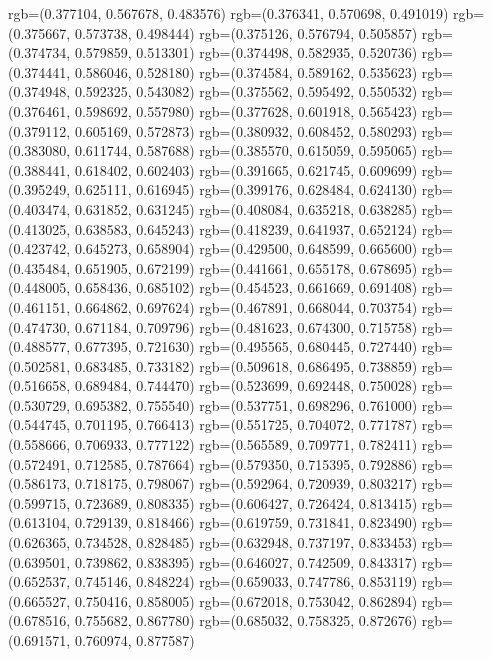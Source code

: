 {{{					rgb=(0.377104, 0.567678, 0.483576)
					rgb=(0.376341, 0.570698, 0.491019)
					rgb=(0.375667, 0.573738, 0.498444)
					rgb=(0.375126, 0.576794, 0.505857)
					rgb=(0.374734, 0.579859, 0.513301)
					rgb=(0.374498, 0.582935, 0.520736)
					rgb=(0.374441, 0.586046, 0.528180)
					rgb=(0.374584, 0.589162, 0.535623)
					rgb=(0.374948, 0.592325, 0.543082)
					rgb=(0.375562, 0.595492, 0.550532)
					rgb=(0.376461, 0.598692, 0.557980)
					rgb=(0.377628, 0.601918, 0.565423)
					rgb=(0.379112, 0.605169, 0.572873)
					rgb=(0.380932, 0.608452, 0.580293)
					rgb=(0.383080, 0.611744, 0.587688)
					rgb=(0.385570, 0.615059, 0.595065)
					rgb=(0.388441, 0.618402, 0.602403)
					rgb=(0.391665, 0.621745, 0.609699)
					rgb=(0.395249, 0.625111, 0.616945)
					rgb=(0.399176, 0.628484, 0.624130)
					rgb=(0.403474, 0.631852, 0.631245)
					rgb=(0.408084, 0.635218, 0.638285)
					rgb=(0.413025, 0.638583, 0.645243)
					rgb=(0.418239, 0.641937, 0.652124)
					rgb=(0.423742, 0.645273, 0.658904)
					rgb=(0.429500, 0.648599, 0.665600)
					rgb=(0.435484, 0.651905, 0.672199)
					rgb=(0.441661, 0.655178, 0.678695)
					rgb=(0.448005, 0.658436, 0.685102)
					rgb=(0.454523, 0.661669, 0.691408)
					rgb=(0.461151, 0.664862, 0.697624)
					rgb=(0.467891, 0.668044, 0.703754)
					rgb=(0.474730, 0.671184, 0.709796)
					rgb=(0.481623, 0.674300, 0.715758)
					rgb=(0.488577, 0.677395, 0.721630)
					rgb=(0.495565, 0.680445, 0.727440)
					rgb=(0.502581, 0.683485, 0.733182)
					rgb=(0.509618, 0.686495, 0.738859)
					rgb=(0.516658, 0.689484, 0.744470)
					rgb=(0.523699, 0.692448, 0.750028)
					rgb=(0.530729, 0.695382, 0.755540)
					rgb=(0.537751, 0.698296, 0.761000)
					rgb=(0.544745, 0.701195, 0.766413)
					rgb=(0.551725, 0.704072, 0.771787)
					rgb=(0.558666, 0.706933, 0.777122)
					rgb=(0.565589, 0.709771, 0.782411)
					rgb=(0.572491, 0.712585, 0.787664)
					rgb=(0.579350, 0.715395, 0.792886)
					rgb=(0.586173, 0.718175, 0.798067)
					rgb=(0.592964, 0.720939, 0.803217)
					rgb=(0.599715, 0.723689, 0.808335)
					rgb=(0.606427, 0.726424, 0.813415)
					rgb=(0.613104, 0.729139, 0.818466)
					rgb=(0.619759, 0.731841, 0.823490)
					rgb=(0.626365, 0.734528, 0.828485)
					rgb=(0.632948, 0.737197, 0.833453)
					rgb=(0.639501, 0.739862, 0.838395)
					rgb=(0.646027, 0.742509, 0.843317)
					rgb=(0.652537, 0.745146, 0.848224)
					rgb=(0.659033, 0.747786, 0.853119)
					rgb=(0.665527, 0.750416, 0.858005)
					rgb=(0.672018, 0.753042, 0.862894)
					rgb=(0.678516, 0.755682, 0.867780)
					rgb=(0.685032, 0.758325, 0.872676)
					rgb=(0.691571, 0.760974, 0.877587)
}}}
